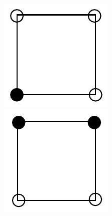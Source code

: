 \documentclass[10pt]{article}
\begin{document}
\includegraphics[max width=\textwidth, center]{2025_09_05_3ba26226ec0baddb5a03g-50(8)}\\
\includegraphics[max width=\textwidth, center]{2025_09_05_3ba26226ec0baddb5a03g-50(1)}\\
\end{document}
